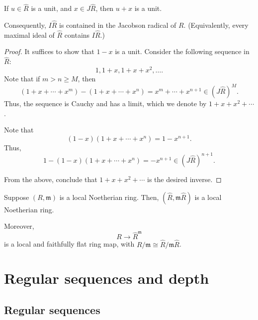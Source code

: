 \documentclass[12pt]{article}
\begin{document}
\begin{cor}
	If $u \in \widehat{R}$ is a unit, and $x \in J \widehat{R}$, then $u + x$ is a unit.

	Consequently, $I \widehat{R}$ is contained in the Jacobson radical of $R$. (Equivalently, every maximal ideal of $\widehat{R}$ contains $I \widehat{R}$.)
\end{cor}
\begin{proof} 
	It suffices to show that $1 - x$ is a unit. Consider the following sequence in $\widehat{R}$:
	\begin{equation*} 
		1, 1 + x, 1 + x + x^{2}, \ldots.
	\end{equation*}
	Note that if $m > n \ge M$, then
	\begin{equation*} 
		(1 + x + \cdots + x^{m}) - (1 + x + \cdots + x^{n}) = x^{m} + \cdots + x^{n + 1} \in (J \widehat{R})^{M}.
	\end{equation*}
	Thus, the sequence is Cauchy and has a limit, which we denote by $1 + x + x^{2} + \cdots$.

	Note that
	\begin{equation*} 
		(1 - x)(1 + x + \cdots + x^{n}) = 1 - x^{n + 1}.
	\end{equation*}
	Thus,
	\begin{equation*} 
		1 - (1 - x)(1 + x + \cdots + x^{n}) = -x^{n + 1} \in (J \widehat{R})^{n + 1}.
	\end{equation*}

	From the above, conclude that $1 + x + x^{2} + \cdots$ is the desired inverse.
\end{proof}

\begin{cor}
	Suppose $(R, \mathfrak{m})$ is a local Noetherian ring. Then, $(\widehat{R}, \mathfrak{m} \widehat{R})$ is a local Noetherian ring.

	Moreover,
	\begin{equation*} 
		R \to \widehat{R}^{\mathfrak{m}}
	\end{equation*}
	is a local and faithfully flat ring map, with $R/\mathfrak{m} \cong \widehat{R}/\mathfrak{m}\widehat{R}$.
\end{cor}

\section{Regular sequences and depth}

\subsection{Regular sequences}
\end{document}
